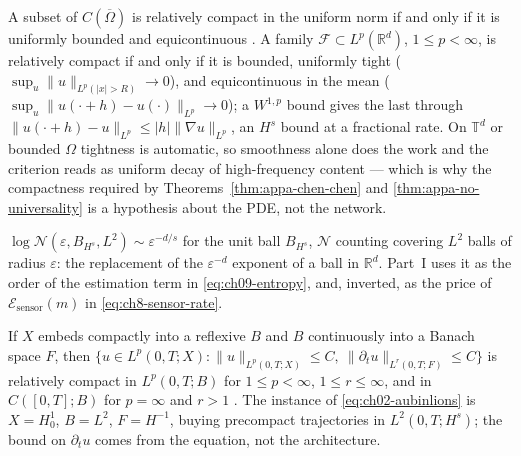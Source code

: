 \begin{theorem}\label{thm:appa-compactness}
A subset of $C(\overline{\Omega})$ is relatively compact in the uniform norm if and only if it
is uniformly bounded and equicontinuous \cite{brezis2011functional}. A family
$\mathcal{F} \subset L^p(\mathbb{R}^d)$,
$1 \le p < \infty$, is relatively compact if and only if it is bounded, uniformly tight
($\sup_u \|u\|_{L^p(|x|>R)} \to 0$), and equicontinuous in the mean
($\sup_u \|u(\cdot+h) - u(\cdot)\|_{L^p} \to 0$); a $W^{1,p}$ bound gives the last through
$\|u(\cdot+h)-u\|_{L^p} \le |h|\|\nabla u\|_{L^p}$, an $H^s$ bound at a fractional rate. On
$\mathbb{T}^d$ or bounded $\Omega$ tightness is automatic, so smoothness alone does the work
and the criterion reads as uniform decay of high-frequency content --- which is why the
compactness required by Theorems~\ref{thm:appa-chen-chen} and \ref{thm:appa-no-universality}
is a hypothesis about the PDE, not the network.
\end{theorem}

\begin{proposition}\label{prop:appa-entropy}
$\log \mathcal{N}(\varepsilon, B_{H^s}, L^2) \sim \varepsilon^{-d/s}$ for the unit ball
$B_{H^s}$, $\mathcal{N}$ counting covering $L^2$ balls of radius $\varepsilon$: the
replacement of the $\varepsilon^{-d}$ exponent of a ball in $\mathbb{R}^d$. Part~I uses it as
the order of the estimation term in \eqref{eq:ch09-entropy}, and, inverted, as the price of
$\mathcal{E}_{\text{sensor}}(m)$ in \eqref{eq:ch8-sensor-rate}.
\end{proposition}

\begin{lemma}\label{lem:appa-aubin-lions}
If $X$ embeds compactly into a reflexive $B$ and $B$ continuously into a Banach space $F$,
then $\{ u \in L^p(0,T;X) : \|u\|_{L^p(0,T;X)} \le C,\ \|\partial_t u\|_{L^r(0,T;F)} \le C \}$
is relatively compact in $L^p(0,T;B)$ for $1 \le p < \infty$, $1 \le r \le \infty$, and in
$C([0,T];B)$ for $p = \infty$ and $r > 1$ \cite{evans2010partial}. The instance of
\eqref{eq:ch02-aubinlions} is
$X = H^1_0$, $B = L^2$, $F = H^{-1}$, buying precompact trajectories in $L^2(0,T;H^s)$; the
bound on $\partial_t u$ comes from the equation, not the architecture.
\end{lemma}

